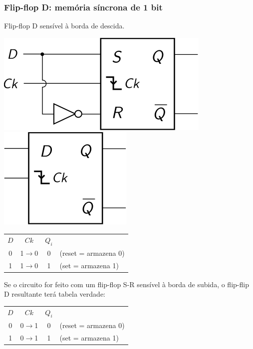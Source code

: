 \documentclass{beamer}
\begin{document}
\begin{frame}
\frametitle{Flip-flop D: memória síncrona de 1 bit}

Flip-flop D sensível à borda de descida.

\begin{center}
\includegraphics{images/flipflopD_circuit}%
\hspace{3ex}%
\raisebox{40pt}{\Huge$=$}%
\hspace{3ex}%
\includegraphics{images/flipflopD_blackbox}

\vspace{12pt}

\begin{tabular}{cc||cl}
 $D$ &        $Ck$       & $Q_i$ \\
\cline{1-3}
  0  &  1$\rightarrow$0  &     0      & (reset = armazena 0) \\
  1  &  1$\rightarrow$0  &     1      & (set = armazena 1) \\
\end{tabular}
\end{center}

\pause

\vspace{6pt}

\begin{minipage}{0.42\textwidth}
Se o circuito for feito com um flip-flop S-R sensível à borda de subida, o
flip-flip D resultante terá tabela verdade:
\end{minipage}
\hfill
\begin{minipage}{0.55\textwidth}
\begin{tabular}{cc||cl}
 $D$ &        $Ck$       & $Q_i$ \\
\cline{1-3}
  0  &  0$\rightarrow$1  &     0      & (reset = armazena 0) \\
  1  &  0$\rightarrow$1  &     1      & (set = armazena 1) \\
\end{tabular}
\end{minipage}

\end{frame}
\end{document}
